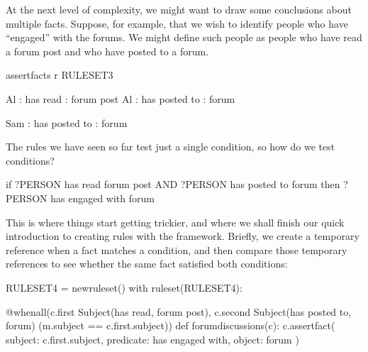 \documentclass[letterpaper,10pt,english]{sphinxmanual}
\begin{document}
{At the next level of complexity, we might want to draw some conclusions about multiple facts. Suppose, for example, that we wish to identify people who have “engaged” with the forums. We might define such people as people who have read a forum post and who have posted to a forum.

{
\begin{sphinxVerbatim}[commandchars=\\\{\}]
\llap{\color{nbsphinxin}[ ]:\,\hspace{\fboxrule}\hspace{\fboxsep}}\PYGZpc{}\PYGZpc{}assert\PYGZus{}facts \PYGZhy{}r RULESET\PYGZus{}3

Al : has read : forum post
Al : has posted to : forum

Sam : has posted to : forum
\end{sphinxVerbatim}
}

The rules we have seen so far test just a single condition, so how do we test  conditions?

\begin{sphinxVerbatim}[commandchars=\\\{\}]
if ?PERSON has read forum post AND ?PERSON has posted to forum
then ?PERSON has engaged with forum
\end{sphinxVerbatim}

This is where things start getting trickier, and where we shall finish our quick introduction to creating rules with the  framework. Briefly, we create a temporary reference when a fact matches a condition, and then compare those temporary references to see whether the same fact satisfied both conditions:

{
\begin{sphinxVerbatim}[commandchars=\\\{\}]
\llap{\color{nbsphinxin}[ ]:\,\hspace{\fboxrule}\hspace{\fboxsep}}RULESET\PYGZus{}4 = new\PYGZus{}ruleset()
with ruleset(RULESET\PYGZus{}4):

    @when\PYGZus{}all(c.first \PYGZlt{}\PYGZlt{} Subject(\PYGZsq{}has read\PYGZsq{}, \PYGZsq{}forum post\PYGZsq{}),
              c.second \PYGZlt{}\PYGZlt{} Subject(\PYGZsq{}has posted to\PYGZsq{}, \PYGZsq{}forum\PYGZsq{}) \PYGZam{} (m.subject == c.first.subject))
    def forum\PYGZus{}discussions(c):
        c.assert\PYGZus{}fact(\PYGZob{} \PYGZsq{}subject\PYGZsq{}: c.first.subject,
                       \PYGZsq{}predicate\PYGZsq{}: \PYGZsq{}has engaged with\PYGZsq{},
                       \PYGZsq{}object\PYGZsq{}: \PYGZsq{}forum\PYGZsq{} \PYGZcb{})


\end{sphinxVerbatim}}}
\end{document}
